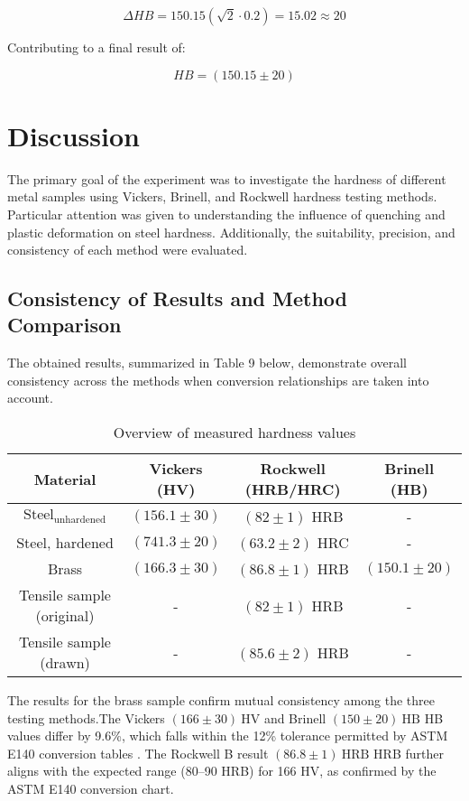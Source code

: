 \documentclass[a4paper]{article}
\newcommand{\unit}[1]{~\mathrm{#1}}
\begin{document}
\[\Delta HB = 150.15 (\sqrt{2} \cdot 0.2) = 15.02 \approx 20\]

Contributing to a final result of:

\[ HB = (150.15 \pm 20)\]

\section{Discussion}

The primary goal of the experiment was to investigate the hardness of different metal samples using Vickers, Brinell, and Rockwell hardness testing methods. Particular attention was given to understanding the influence of quenching and plastic deformation on steel hardness. Additionally, the suitability, precision, and consistency of each method were evaluated.

\subsection{Consistency of Results and Method Comparison}

The obtained results, summarized in Table 9 below, demonstrate overall
consistency across the methods when conversion relationships are taken into
account.

\begin{table}[!ht]
  \centering
  \label{tab:9}
  \caption{Overview of measured hardness values}
  \begin{tabular}{c|ccc}
  Material                  & Vickers (HV) & Rockwell (HRB/HRC) & Brinell (HB)  \\ 
  \hline
  $\mathrm{Steel_{unhardened}}$         & $(156.1 \pm 30)$   & $(82 \pm 1)$ HRB         & -             \\
  Steel, hardened           & $(741.3 \pm 20)$  & $(63.2 \pm 2)$ HRC       & -             \\
  Brass                     & $(166.3 \pm 30)$   & $(86.8 \pm 1)$ HRB       & $(150.1 \pm 20)$      \\
  Tensile sample (original) & -            & $(82 \pm 1)$ HRB         & -             \\
  Tensile sample (drawn)    & -            & $(85.6 \pm 2)$ HRB       & -            
  \end{tabular}
  \end{table}

  The results for the brass sample confirm mutual consistency among the three
  testing methods.The Vickers $(166 \pm 30)\unit{HV}$ and Brinell $(150 \pm 20)\unit{HB}$
  HB values differ by 9.6\%, which falls within the 12\% tolerance permitted by
  ASTM E140 conversion tables \cite{ASTME140}. The Rockwell B result $(86.8 \pm 1)\unit{HRB}$
  HRB further aligns with the expected range (80–90 HRB) for 166 HV, as
  confirmed by the ASTM E140 conversion chart.
\end{document}
